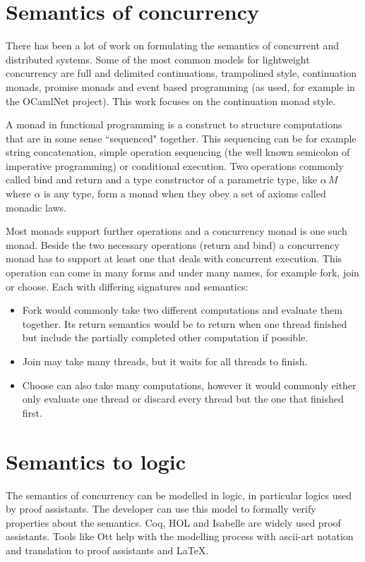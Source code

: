 \documentclass[12pt,twoside,notitlepage]{report}
\begin{document}
\section{Semantics of concurrency}

There has been a lot of work on formulating the semantics of concurrent and distributed systems. Some of the most common models for lightweight concurrency\cite{deleuzelight} are full\cite{friedman1988applications,leroyocaml} and delimited\cite{kiselyov2010delimited} continuations\cite{shan2004shift}, trampolined style\cite{ganz1999trampolined}, continuation monads\cite{Claessen99functionalpearls}, promise monads\cite{liskov1988promises} and event based programming (as used, for example in the OCamlNet\cite{Ocamlnet} project). This work focuses on the continuation monad style.

A monad\cite{hoareetal2001tackling} in functional programming is a construct to structure computations that are in some sense ``sequenced" together. This sequencing can be for example string concatenation, simple operation sequencing (the well known semicolon of imperative programming) or conditional execution. Two operations commonly called bind and return and a type constructor of a parametric type, like $ \alpha \, M $ where $ \alpha $ is any type, form a monad when they obey a set of axioms called monadic laws.

Most monads support further operations and a concurrency monad is one such monad. Beside the two necessary operations (return and bind) a concurrency monad has to support at least one that deals with concurrent execution.  This operation can come in many forms and under many names, for example fork, join or choose. Each with differing signatures and semantics:
\begin{itemize}
\item{Fork would commonly take two different computations and evaluate them together. Its return semantics would be to return when one thread finished but include the partially completed other computation if possible.}
\item{Join may take many threads, but it waits for all threads to finish.}
\item{Choose can also take many computations, however it would commonly either only evaluate one thread or discard every thread but the one that finished first.}
\end{itemize}

\section{Semantics to logic}
The semantics of concurrency can be modelled in logic, in particular logics used by proof assistants. The developer can use this model to formally verify properties about the semantics\cite{benton2008mechanized,blazy2009mechanized,blazy2006formal,leroy2009formal}. Coq\cite{Coq}, HOL and Isabelle are widely used proof assistants. Tools like Ott\cite{Ott} help with the modelling process with ascii-art notation and translation to proof assistants and \LaTeX.
\end{document}

